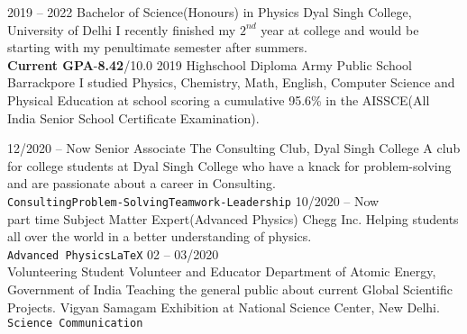 \documentclass[9pt]{developercv} %
\begin{document}


\begin{entrylist}
	

	\entry
		{2019 -- 2022}
		{Bachelor of Science(Honours) in Physics}
		{Dyal Singh College, University of Delhi}
		{I recently finished my $2^{nd}$ year at college and would be starting with my penultimate semester after summers.\\ \textbf{Current GPA}-\textbf{8.42}/10.0}
	\entry
		{2019}
		{Highschool Diploma}
		{Army Public School Barrackpore}
		{I studied Physics, Chemistry, Math, English, Computer Science and Physical Education at school scoring a cumulative 95.6\% in the AISSCE(All India Senior School Certificate Examination).}
\end{entrylist}




\begin{entrylist}
	\entry
		{12/2020 -- Now}
		{Senior Associate}
		{The Consulting Club, Dyal Singh College}
		{A club for college students at Dyal Singh College who have a knack for problem-solving and are passionate about a career in Consulting.\\ 
		\texttt{Consulting}\slashsep\texttt{Problem-Solving}\slashsep\texttt{Teamwork-Leadership}}
	\entry
		{10/2020 -- Now\\\footnotesize{part time}}
		{Subject Matter Expert(Advanced Physics)}
		{Chegg Inc.}
		{Helping students all over the world in a better understanding of physics.\\ \texttt{Advanced Physics}\slashsep\texttt{LaTeX}}
	\entry
		{02 -- 03/2020\\\footnotesize{Volunteering}}
		{Student Volunteer and Educator}
		{Department of Atomic Energy, Government of India}
		{Teaching the general public about current Global Scientific Projects. Vigyan Samagam Exhibition at National Science Center, New Delhi.\\ 
		\texttt{Science Communication}}
\end{entrylist}
\end{document}
